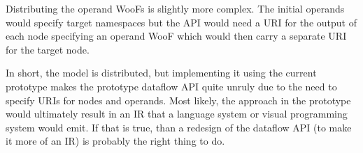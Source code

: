 \documentclass[10pt]{article}
\begin{document}
Distributing the operand WooFs is slightly more complex.  The initial operands
would specify target namespaces but the API would need a URI for the output of
each node specifying an operand WooF which would then carry a separate URI for
the target node.

In short, the model is distributed, but implementing it using the current
prototype makes the prototype dataflow API quite unruly due to the need to
specify URIs for nodes and operands.  Most likely, the approach in the
prototype would ultimately result in an IR that a language system or visual
programming system would emit.  If that is true, than a redesign of the
dataflow API (to make it more of an IR) is probably the right thing to do.
\end{document}
